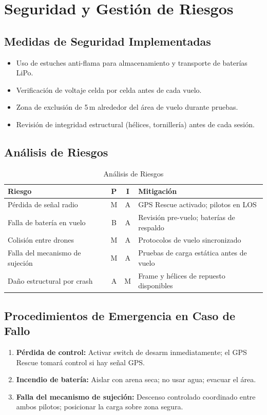\documentclass[10pt, twocolumn, letterpaper]{article}
\begin{document}
\section{Seguridad y Gestión de Riesgos}
\subsection{Medidas de Seguridad Implementadas}
\begin{itemize}[leftmargin=*, itemsep=0pt, topsep=2pt]
\item Uso de estuches anti-flama para almacenamiento y transporte de baterías LiPo.
\item Verificación de voltaje celda por celda antes de cada vuelo.
\item Zona de exclusión de 5\,m alrededor del área de vuelo durante pruebas.
\item Revisión de integridad estructural (hélices, tornillería) antes de cada sesión.
\end{itemize}

\subsection{Análisis de Riesgos}
\begin{table}[H]
\caption{Análisis de Riesgos}
\fontsize{8}{9}\selectfont
\begin{tabularx}{\columnwidth}{>{\raggedright}p{1.6cm} c c X}
\toprule
\textbf{Riesgo} & \textbf{P} & \textbf{I} & \textbf{Mitigación} \\
\midrule
Pérdida de señal radio & M & A & GPS Rescue activado; pilotos en LOS \\
Falla de batería en vuelo & B & A & Revisión pre-vuelo; baterías de respaldo \\
Colisión entre drones & M & A & Protocolos de vuelo sincronizado \\
Falla del mecanismo de sujeción & M & A & Pruebas de carga estática antes de vuelo \\
Daño estructural por crash & A & M & Frame y hélices de repuesto disponibles \\
\bottomrule
\end{tabularx}
\end{table}

\subsection{Procedimientos de Emergencia en Caso de Fallo}
\begin{enumerate}[leftmargin=*, itemsep=0pt, topsep=2pt]
\item \textbf{Pérdida de control:} Activar switch de desarm inmediatamente; el GPS Rescue tomará control si hay señal GPS.
\item \textbf{Incendio de batería:} Aislar con arena seca; no usar agua; evacuar el área.
\item \textbf{Falla del mecanismo de sujeción:} Descenso controlado coordinado entre ambos pilotos; posicionar la carga sobre zona segura.
\end{enumerate}
\end{document}
